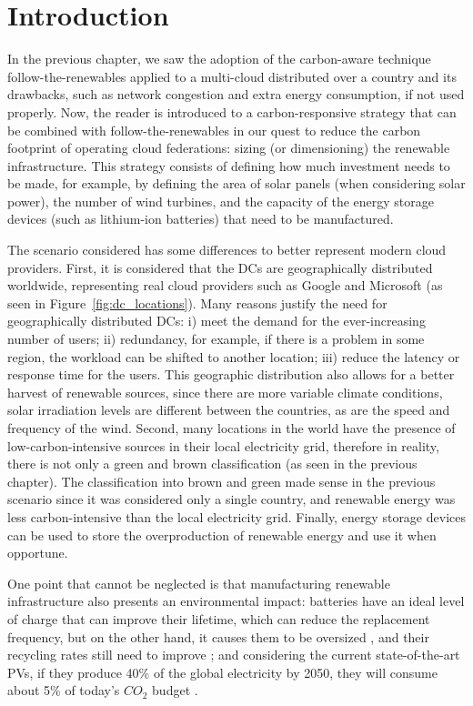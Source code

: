 \section{Introduction}

In the previous chapter, we saw the adoption of the carbon-aware technique follow-the-renewables applied to a multi-cloud distributed over a country and its drawbacks, such as network congestion and extra energy consumption, if not used properly. Now, the reader is introduced to a carbon-responsive strategy that can be combined with follow-the-renewables in our quest to reduce the carbon footprint of operating cloud federations: sizing (or dimensioning) the renewable infrastructure. This strategy consists of defining how much investment needs to be made, for example, by defining the area of solar panels (when considering solar power), the number of wind turbines, and the capacity of the energy storage devices (such as lithium-ion batteries) that need to be manufactured.


The scenario considered has some differences to better represent modern cloud providers. First, it is considered that the DCs are geographically distributed worldwide, representing real cloud providers such as Google and Microsoft (as seen in Figure~\ref{fig:dc_locations}). Many reasons justify the need for geographically distributed DCs: i) meet the demand for the ever-increasing number of users; ii) redundancy, for example, if there is a problem in some region, the workload can be shifted to another location; iii) reduce the latency or response time for the users. This geographic distribution also allows for a better harvest of renewable sources, since there are more variable climate conditions, solar irradiation levels are different between the countries, as are the speed and frequency of the  wind. Second, many locations in the world have the presence of low-carbon-intensive sources in their local electricity grid, therefore in reality, there is not only a green and brown classification (as seen in the previous chapter). The classification into brown and green made sense in the previous scenario since it was considered only a single country, and renewable energy was less carbon-intensive than the local electricity grid. Finally, energy storage devices can be used to store the overproduction of renewable energy and use it when opportune.

One point that cannot be neglected is that manufacturing renewable infrastructure also presents an environmental impact: batteries have an ideal level of charge that can improve their lifetime, which can reduce the replacement frequency, but on the other hand, it causes them to be oversized \cite{batteries_baumman}, and their recycling rates still need to improve \cite{bateries_RAHMAN}; and considering the current state-of-the-art PVs, if they produce 40\% of the global electricity by 2050, they will consume about 5\% of today’s ${CO_2}$ budget \cite{solar_co2}.

